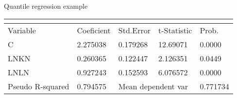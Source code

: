 \documentclass{beamer}
\begin{document}
\begin{frame}{Quantile regression example}
\begin{table}[]
\begin{tabular}{@{}lllll@{}}
\multicolumn{5}{l}{}                                                                                                                                                                                                                                                                                                                                                                                                                     \\ \midrule
Variable                                                                                       & Coeficient                                                                       & Std.Error                                                                       & t-Statistic                                                                       & Prob.                                                                          \\ \midrule
C                                                                                              & 2.275038                                                                         & 0.179268                                                                        & 12.69071                                                                          & 0.0000                                                                         \\
LNKN                                                                                           & 0.260365                                                                         & 0.122447                                                                        & 2.126351                                                                          & 0.0449                                                                         \\
LNLN                                                                                           & 0.927243                                                                         & 0.152593                                                                        & 6.076572                                                                          & 0.0000                                                                         \\ \midrule
Pseudo R-squared                                                                               & 0.794575                                                                         & \multicolumn{2}{l}{Mean dependent var}                                                                                                                              & 0.771734                                                                       \\

\end{tabular}
\end{table}
\end{frame}
\end{document}
